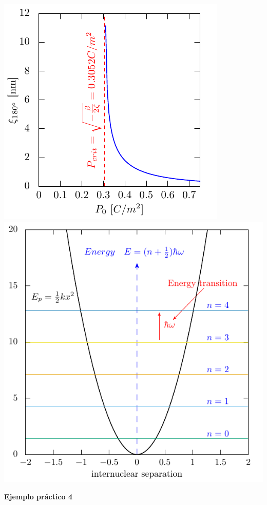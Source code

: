\documentclass[11.5pt,a4paper]{article}
\begin{document}
\includegraphics[scale=0.95]{ejemplo7.pdf}
\includegraphics[scale=0.80]{ejemplo12.pdf} 

\textbf{Ejemplo práctico 4}
\end{document}
